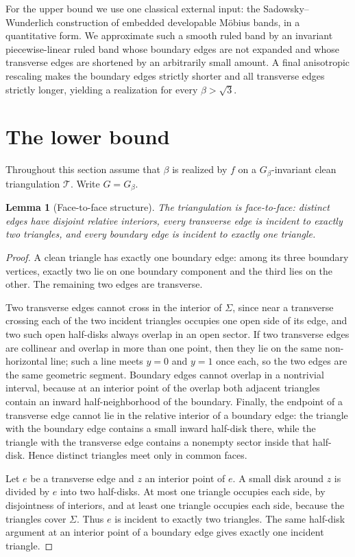 \documentclass[12pt]{article}
\theoremstyle{plain}
\newtheorem{lemma}[theorem]{Lemma}
\begin{document}
For the upper bound we use one classical external input: the
Sadowsky--Wunderlich construction of embedded developable M\"obius bands, in a
quantitative form.  We approximate such a smooth ruled band by an invariant
piecewise-linear ruled band whose boundary edges are not expanded and whose
transverse edges are shortened by an arbitrarily small amount.  A final
anisotropic rescaling makes the boundary edges strictly shorter and all
transverse edges strictly longer, yielding a realization for every
\(\beta>\sqrt3\).

\section{The lower bound}

Throughout this section assume that \(\beta\) is realized by \(f\) on a
\(G_\beta\)-invariant clean triangulation \(\mathcal T\).  Write
\(G=G_\beta\).

\begin{lemma}[Face-to-face structure]\label{lem:facetoface}
The triangulation is face-to-face: distinct edges have disjoint relative
interiors, every transverse edge is incident to exactly two triangles, and
every boundary edge is incident to exactly one triangle.
\end{lemma}

\begin{proof}
A clean triangle has exactly one boundary edge: among its three boundary
vertices, exactly two lie on one boundary component and the third lies on the
other.  The remaining two edges are transverse.

Two transverse edges cannot cross in the interior of \(\Sigma\), since near a
transverse crossing each of the two incident triangles occupies one open side
of its edge, and two such open half-disks always overlap in an open sector.  If
two transverse edges are collinear and overlap in more than one point, then
they lie on the same non-horizontal line; such a line meets \(y=0\) and
\(y=1\) once each, so the two edges are the same geometric segment.  Boundary
edges cannot overlap in a nontrivial interval, because at an interior point of
the overlap both adjacent triangles contain an inward half-neighborhood of the
boundary.  Finally, the endpoint of a transverse edge cannot lie in the
relative interior of a boundary edge: the triangle with the boundary edge
contains a small inward half-disk there, while the triangle with the transverse
edge contains a nonempty sector inside that half-disk.  Hence distinct
triangles meet only in common faces.

Let \(e\) be a transverse edge and \(z\) an interior point of \(e\).  A small
disk around \(z\) is divided by \(e\) into two half-disks.  At most one
triangle occupies each side, by disjointness of interiors, and at least one
triangle occupies each side, because the triangles cover \(\Sigma\).  Thus
\(e\) is incident to exactly two triangles.  The same half-disk argument at an
interior point of a boundary edge gives exactly one incident triangle.
\end{proof}
\end{document}
